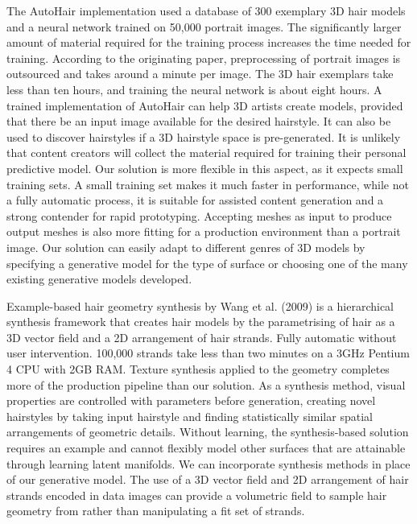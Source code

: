 \documentclass[ %
author={Dillon Keith Diep},
supervisor={Dr. Carl Henrik Ek},
degree={MEng},
title={ART-CG Hair:},
subtitle={Assisted Real-time Content Generation of Stylised Virtual Hair},
type={Research},
year={2017} ]{dissertation}
\begin{document}
	The AutoHair implementation used a database of 300 exemplary 3D hair models and a neural network trained on 50,000 portrait images. The significantly larger amount of material required for the training process increases the time needed for training. According to the originating paper, preprocessing of portrait images is outsourced and takes around a minute per image. The 3D hair exemplars take less than ten hours, and training the neural network is about eight hours. A trained implementation of AutoHair can help 3D artists create models, provided that there be an input image available for the desired hairstyle. It can also be used to discover hairstyles if a 3D hairstyle space is pre-generated. It is unlikely that content creators will collect the material required for training their personal predictive model. Our solution is more flexible in this aspect, as it expects small training sets. A small training set makes it much faster in performance, while not a fully automatic process, it is suitable for assisted content generation and a strong contender for rapid prototyping. Accepting meshes as input to produce output meshes is also more fitting for a production environment than a portrait image. Our solution can easily adapt to different genres of 3D models by specifying a generative model for the type of surface or choosing one of the many existing generative models developed.
	
	Example-based hair geometry synthesis by Wang et al. (2009) \cite{examplebasedhair} is a hierarchical synthesis framework that creates hair models by the parametrising of hair as a 3D vector field and a 2D arrangement of hair strands. Fully automatic without user intervention. 100,000 strands take less than two minutes on a 3GHz Pentium 4 CPU with 2GB RAM. Texture synthesis applied to the geometry completes more of the production pipeline than our solution. As a synthesis method, visual properties are controlled with parameters before generation, creating novel hairstyles by taking input hairstyle and finding statistically similar spatial arrangements of geometric details. Without learning, the synthesis-based solution requires an example and cannot flexibly model other surfaces that are attainable through learning latent manifolds. We can incorporate synthesis methods in place of our generative model. The use of a 3D vector field and 2D arrangement of hair strands encoded in data images can provide a volumetric field to sample hair geometry from rather than manipulating a fit set of strands.
	
\end{document}

